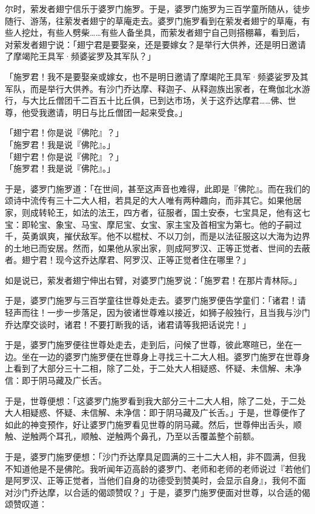 尔时，萦发者翅宁信乐于婆罗门施罗。于是，婆罗门施罗为三百学童所随从，徒步随行、游荡，往萦发者翅宁的草庵走去。婆罗门施罗看到在萦发者翅宁的草庵，有些人挖灶，有些人劈柴……有些人备坐具，而萦发者翅宁自己则搭棚幕，看到后，对萦发者翅宁说：「翅宁君是要娶亲，还是要嫁女？是举行大供养，还是明日邀请了摩竭陀王具军·频婆娑罗及其军队？」


「施罗君！我不是要娶亲或嫁女，也不是明日邀请了摩竭陀王具军·频婆娑罗及其军队，而是举行大供养。有沙门乔达摩、释迦子、从释迦族出家者，在鸯伽北水游行，与大比丘僧团千二百五十比丘俱，已到达市场，关于这乔达摩君……佛、世尊，他受我邀请，明日与比丘僧团一起来受食。」

「翅宁君！你是说『佛陀』？」\\
「施罗君！我是说『佛陀』。」\\
「翅宁君！你是说『佛陀』？」\\
「施罗君！我是说『佛陀』。」


于是，婆罗门施罗道：「在世间，甚至这声音也难得，此即是『佛陀』。而在我们的颂诗中流传有三十二大人相，若具足的大人唯有两种趣向，而非其它。如果他居家，则成转轮王，如法的法王，四方者，征服者，国土安泰，七宝具足，他有这七宝：即轮宝、象宝、马宝、摩尼宝、女宝、家主宝及首相宝为第七。他的子嗣过千，英勇飒爽，摧伏敌军。他不以棍杖、不以刀剑，而是以法征服这以大海为边界的土地已而安居。然而，如果他从家出家，则成阿罗汉、正等正觉者、世间的去蔽者。翅宁君！现今这乔达摩君、阿罗汉、正等正觉者住在哪里？」


如是说已，萦发者翅宁伸出右臂，对婆罗门施罗说：「施罗君！在那片青林际。」


于是，婆罗门施罗与三百学童往世尊处走去。婆罗门施罗便告学童们：「诸君！请轻声而往！一步一步落足，因为彼诸世尊难以接近，如狮子般独行，且当我与沙门乔达摩交谈时，诸君！不要打断我的话，诸君请等我把话说完！」


于是，婆罗门施罗便往世尊处走去，走到后，问候了世尊，彼此寒暄已，坐在一边。坐在一边的婆罗门施罗便在世尊身上寻找三十二大人相。婆罗门施罗在世尊身上看到了大部分三十二相，除了二处，于二处大人相疑惑、怀疑、未信解、未净信：即于阴马藏及广长舌。


于是，世尊便想：「这婆罗门施罗看到我大部分三十二大人相，除了二处，于二处大人相疑惑、怀疑、未信解、未净信：即于阴马藏及广长舌。」于是，世尊便作了如此的神变预作，好让婆罗门施罗看见世尊的阴马藏。然后，世尊伸出舌头，顺触、逆触两个耳孔，顺触、逆触两个鼻孔，乃至以舌覆盖整个前额。


于是，婆罗门施罗便想：「沙门乔达摩具足圆满的三十二大人相，非不圆满，但我不知道他是不是佛陀。我听闻年迈高龄的婆罗门、老师和老师的老师说过『若他们是阿罗汉、正等正觉者，当他们自身的功德受到赞美时，会显示自身』，我何不面对沙门乔达摩，以合适的偈颂赞叹？」于是，婆罗门施罗便面对世尊，以合适的偈颂赞叹道：

